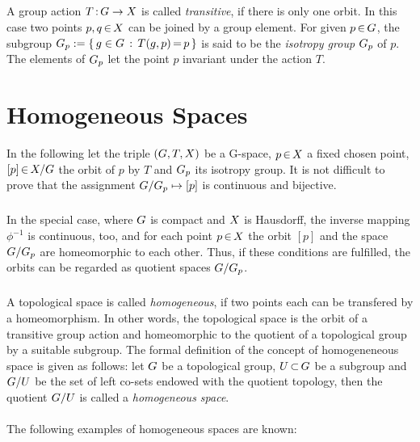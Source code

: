 \documentclass[11pt,twoside]{article}
\begin{document}
\subparagraph{}
A group action $T {\,:\,} G \to X$ is called \textit{transitive},
if there is only one orbit.
In this case two points $p,q {\,\in\,} X$ can be joined by a group element.
For given $p {\,\in\,} G$,
the subgroup $G_p := \{ \, g \in G \,: \, T(g,p) {\,=\,} p \, \}$
is said to be the \textit{isotropy group} $G_p$ of $p$.
The elements of $G_p$ let the point $p$ invariant under the action $T$.

\section{Homogeneous Spaces}                                                   %
In the following let the triple $(G,T,X)$ be a G-space,
$p {\,\in\,} X$ a fixed chosen point,
$[p] {\,\in\,} X/G$ the orbit of $p$ by $T$
and $G_p$ its isotropy group.
It is not difficult to prove
that the assignment $G/G_p \mapsto [p]$ is continuous and bijective.

\subparagraph{}
In the special case,
where $G$ is compact and $X$ is Hausdorff,
the inverse mapping $\phi^{-1}$ is continuous,
too,
and for each point $p {\,\in\,} X$ the orbit $[p]$
and the space $G/G_p$ are homeomorphic to each other.
Thus,
if these conditions are fulfilled,
the orbits can be regarded as quotient spaces $G/G_p$.

\subparagraph{}
A topological space is called \textit{homogeneous},
if two points each can be transfered by a homeomorphism.
In other words,
the topological space is the orbit of a transitive group action and
homeomorphic to the quotient of a topological group by a suitable subgroup.
The formal definition of the concept of homogeneneous space is given as follows:
let $G$ be a topological group,
$U {\,\subset\,} G$ be a subgroup
and $G/U$ be the set of left co-sets endowed with the quotient topology,
then the quotient $G/U$ is called a \textit{homogeneous space}.

\paragraph{}
The following examples of homogeneous spaces are known:
\end{document}
